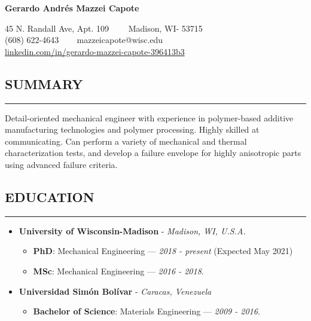 \documentclass[11pt,letterpaper]{article}
\newenvironment{indentsection}[1]%
{\begin{list}{}%
	{\setlength{\leftmargin}{#1}}%
	\item[]%
}
{\end{list}}
\begin{document}
	\thispagestyle{firststyle}

	
\begin{center}
	{\LARGE \textbf{Gerardo Andrés Mazzei Capote}}

	45 N. Randall Ave, Apt. 109\ \ \textbullet
	\ \ Madison, WI- 53715
	\\
	(608) 622-4643 \ \textbullet
	\ \ mazzeicapote@wisc.edu\\
	\href{https://www.linkedin.com/in/gerardo-mazzei-capote-396413b3}{linkedin.com/in/gerardo-mazzei-capote-396413b3}
	
\end{center}

\vspace{-1em}

\subsection*{SUMMARY}
	\vspace{-0.5em}
	\hrule
	\vspace{0.4em}
	\begin{indentsection}{\parindent}
		Detail-oriented mechanical engineer with experience in polymer-based additive manufacturing technologies and polymer processing. Highly skilled at communicating. Can perform a variety of mechanical and thermal characterization tests, and develop a failure envelope for highly anisotropic parts using advanced failure criteria.
	\end{indentsection}


\subsection*{EDUCATION}
	\vspace{-0.5em}
	\hrule
	\vspace{0.4em}
	\begin{itemize}
	\item
	\textbf{University of Wisconsin-Madison} - \emph{Madison, WI, U.S.A.}
	\begin{itemize}	
	\item
	\textbf{PhD}: Mechanical Engineering --- \emph{2018 - present} (Expected May 2021) 
	\item
	\textbf{MSc}: Mechanical Engineering --- \emph{2016 - 2018}. 
\end{itemize}

	\item
	\textbf{Universidad Simón Bolívar} - \emph{Caracas, Venezuela}
	\begin{itemize}	
		\item
		\textbf{Bachelor of Science}: Materials Engineering --- \emph{2009 - 2016}. 
	\end{itemize}
	\end{itemize}
\end{document}
